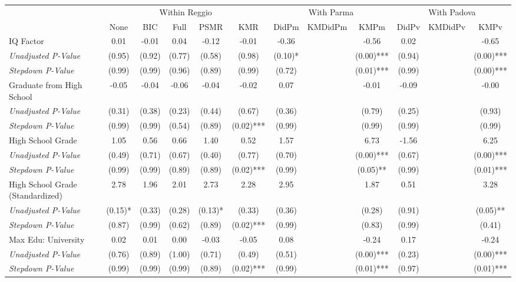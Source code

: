 \begin{tabular}{l c c c c c c c c c c c}
\toprule
& \multicolumn{5}{c}{Within Reggio} & \multicolumn{3}{c}{With Parma} & \multicolumn{3}{c}{With Padova} \\\cmidrule(lr){2-6} \cmidrule(lr){7-9} \cmidrule(lr){10-12}
 & None & BIC & Full & PSMR & KMR & DidPm & KMDidPm & KMPm & DidPv & KMDidPv & KMPv \\
\midrule
IQ Factor & 0.01 & -0.01 & 0.04 & -0.12 & -0.01 & -0.36 & & -0.56 & 0.02 & & -0.65 \\
\quad \textit{Unadjusted P-Value} & (0.95) & (0.92) & (0.77) & (0.58) & (0.98) & (0.10)* & & (0.00)*** & (0.94) & & (0.00)*** \\
\quad \textit{Stepdown P-Value} & (0.99) & (0.99) & (0.96) & (0.89) & (0.99) & (0.72) & & (0.01)*** & (0.99) & & (0.00)*** \\
Graduate from High School & -0.05 & -0.04 & -0.06 & -0.04 & -0.02 & 0.07 & & -0.01 & -0.09 & & -0.00 \\
\quad \textit{Unadjusted P-Value} & (0.31) & (0.38) & (0.23) & (0.44) & (0.67) & (0.36) & & (0.79) & (0.25) & & (0.93) \\
\quad \textit{Stepdown P-Value} & (0.99) & (0.99) & (0.54) & (0.89) & (0.02)*** & (0.99) & & (0.99) & (0.99) & & (0.99) \\
High School Grade & 1.05 & 0.56 & 0.66 & 1.40 & 0.52 & 1.57 & & 6.73 & -1.56 & & 6.25 \\
\quad \textit{Unadjusted P-Value} & (0.49) & (0.71) & (0.67) & (0.40) & (0.77) & (0.70) & & (0.00)*** & (0.67) & & (0.00)*** \\
\quad \textit{Stepdown P-Value} & (0.99) & (0.99) & (0.89) & (0.89) & (0.02)*** & (0.99) & & (0.05)** & (0.99) & & (0.01)*** \\
High School Grade (Standardized) & 2.78 & 1.96 & 2.01 & 2.73 & 2.28 & 2.95 & & 1.87 & 0.51 & & 3.28 \\
\quad \textit{Unadjusted P-Value} & (0.15)* & (0.33) & (0.28) & (0.13)* & (0.33) & (0.36) & & (0.28) & (0.91) & & (0.05)** \\
\quad \textit{Stepdown P-Value} & (0.87) & (0.99) & (0.62) & (0.89) & (0.02)*** & (0.99) & & (0.83) & (0.99) & & (0.41) \\
Max Edu: University & 0.02 & 0.01 & 0.00 & -0.03 & -0.05 & 0.08 & & -0.24 & 0.17 & & -0.24 \\
\quad \textit{Unadjusted P-Value} & (0.76) & (0.89) & (1.00) & (0.71) & (0.49) & (0.51) & & (0.00)*** & (0.23) & & (0.00)*** \\
\quad \textit{Stepdown P-Value} & (0.99) & (0.99) & (0.99) & (0.89) & (0.02)*** & (0.99) & & (0.01)*** & (0.97) & & (0.01)*** \\

\end{tabular}
